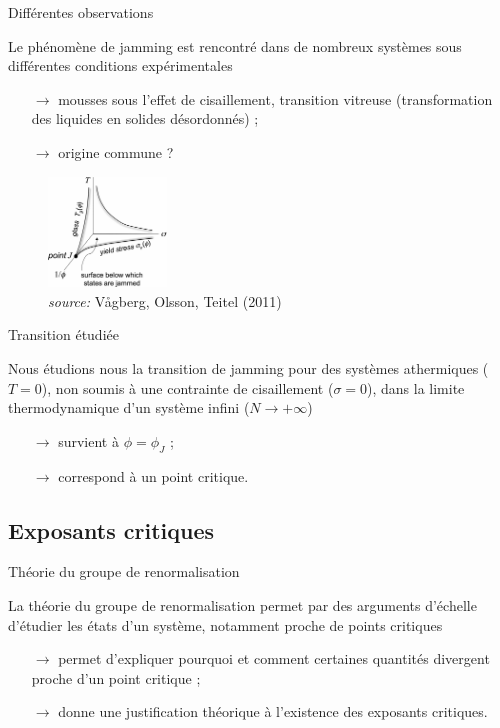 \documentclass{beamer}
\begin{document}
\begin{frame}{Différentes observations}

Le phénomène de jamming est rencontré dans de nombreux systèmes sous différentes conditions expérimentales
\begin{itemize}
\item[$\rightarrow$] mousses sous l’effet de cisaillement, transition vitreuse (transformation des liquides en solides désordonnés) ;
\item[$\rightarrow$] origine commune ?
\end{itemize}

\begin{figure}[h!]
\centering
\includegraphics[width=0.28\textwidth]{figures/images/phase_diagram.png}
\caption{\textit{source:} Vågberg, Olsson, Teitel (2011)}
\end{figure}

\end{frame}

\begin{frame}{Transition étudiée}

Nous étudions nous la transition de jamming pour des systèmes athermiques ($T=0$), non soumis à une contrainte de cisaillement ($\sigma=0$), dans la limite thermodynamique d’un système infini ($N\rightarrow+\infty$)
\begin{itemize}
\item[$\rightarrow$] survient à $\phi = \phi_J$ ;
\item[$\rightarrow$] correspond à un point critique.
\end{itemize}

\end{frame}

\subsection{Exposants critiques}

\begin{frame}{Théorie du groupe de renormalisation}

La théorie du groupe de renormalisation permet par des arguments d’échelle d’étudier les états d’un système, notamment proche de points critiques
\begin{itemize}
\item[$\rightarrow$] permet d’expliquer pourquoi et comment certaines quantités divergent proche d’un point critique ;
\item[$\rightarrow$] donne une justification théorique à l’existence des exposants critiques.
\end{itemize}

\end{frame}
\end{document}
